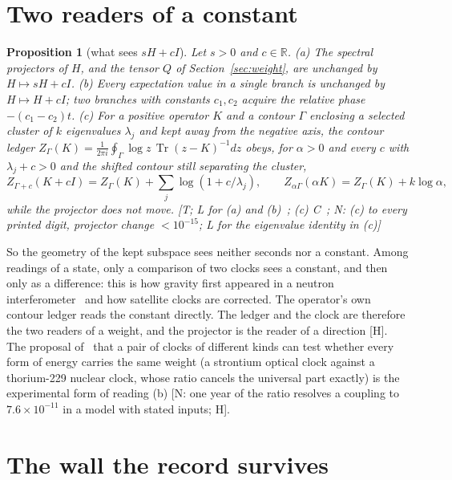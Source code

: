 \documentclass[11pt]{article}
\newtheorem{proposition}[theorem]{Proposition}
\theoremstyle{definition}
\newcommand{\grade}[1]{\textsf{\small[#1]}}
\newcommand{\Tr}{\operatorname{Tr}}
\begin{document}
\section{Two readers of a constant}\label{sec:readers}

\begin{proposition}[what sees $sH+cI$]\label{prop:readers}
Let $s>0$ and $c\in\mathbb R$.
(a) The spectral projectors of $H$, and the tensor $Q$ of Section~\ref{sec:weight}, are unchanged by $H\mapsto sH+cI$.
(b) Every expectation value in a single branch is unchanged by $H\mapsto H+cI$; two branches with constants $c_1,c_2$ acquire the relative phase $-(c_1-c_2)t$.
(c) For a positive operator $K$ and a contour $\Gamma$ enclosing a selected cluster of $k$ eigenvalues $\lambda_j$ and kept away from the negative axis, the contour ledger $Z_\Gamma(K)=\frac1{2\pi i}\oint_\Gamma\log z\,\Tr(z-K)^{-1}dz$ obeys, for $\alpha>0$ and every $c$ with $\lambda_j+c>0$ and the shifted contour still separating the cluster,
\begin{equation}\label{eq:Zshift}
Z_{\Gamma+c}(K+cI)=Z_\Gamma(K)+\sum_j\log(1+c/\lambda_j),\qquad Z_{\alpha\Gamma}(\alpha K)=Z_\Gamma(K)+k\log\alpha ,
\end{equation}
while the projector does not move. \grade{T; L for (a) and (b)~\cite{OSL}; (c) C~\cite[Prop.~30]{GLO}; N: (c) to every printed digit, projector change $<10^{-15}$; L for the eigenvalue identity in (c)}
\end{proposition}

So the geometry of the kept subspace sees neither seconds nor a constant. Among readings of a state, only a comparison of two clocks sees a constant, and then only as a difference: this is how gravity first appeared in a neutron interferometer~\cite{COW} and how satellite clocks are corrected. The operator's own contour ledger reads the constant directly. The ledger and the clock are therefore the two readers of a weight, and the projector is the reader of a direction \grade{H}. The proposal of~\cite{OSL} that a pair of clocks of different kinds can test whether every form of energy carries the same weight (a strontium optical clock against a thorium-229 nuclear clock, whose ratio cancels the universal part exactly) is the experimental form of reading (b) \grade{N: one year of the ratio resolves a coupling to $7.6\times10^{-11}$ in a model with stated inputs; H}.

\section{The wall the record survives}\label{sec:wall}
\end{document}
